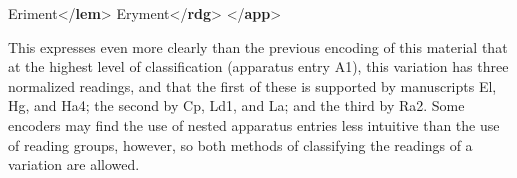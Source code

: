 \begin{shaded}
\hspace*{1em}\hspace*{1em}Eriment{</\textbf{lem}>}\mbox{}\newline 
\hspace*{1em}\hspace*{1em}Eryment{</\textbf{rdg}>}\mbox{}\newline 
\hspace*{1em}\mbox{}\newline 
{}\mbox{}\newline 
{</\textbf{app}>}\end{shaded}\egroup\par \noindent  This expresses even more clearly than the previous encoding of this material that at the highest level of classification (apparatus entry A1), this variation has three normalized readings, and that the first of these is supported by manuscripts El, Hg, and Ha4; the second by Cp, Ld1, and La; and the third by Ra2. Some encoders may find the use of nested apparatus entries less intuitive than the use of reading groups, however, so both methods of classifying the readings of a variation are allowed.\par
